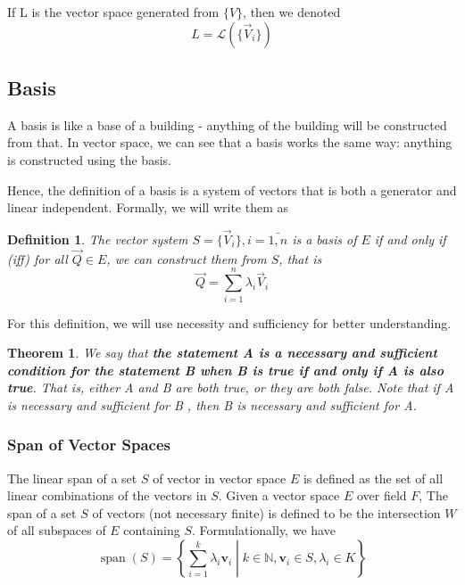 \documentclass{book}
\newtheorem{Definition}{Definition}[section]
\newtheorem{Theorem}{Theorem}[section]
\numberwithin{identity}{subsection}
\numberwithin{Rule}{subsection}
\numberwithin{Theorem}{subsection}
\numberwithin{Definition}{subsection}
\begin{document}
If L is the vector space generated from $\{V\}$, then we denoted $$L=
\mathcal{L}(\{\vec{V}_{i}\})$$

\subsection{Basis}

A basis is like a base of a building - anything of the building will be constructed from that. In vector space, we can see that a basis works the same way: anything is constructed using the basis. 

Hence, the definition of a basis is a system of vectors that is both a generator and linear independent. Formally, we will write them as

\begin{Definition}
    The vector system $S=\{\vec{V}_{i}\}, i=\bar{1,n}$ is a basis of $E$ if and only if (iff) for all $\vec{Q}\in E$, we can construct them from $S$, that is $$\vec{Q}= \sum_{i=1}^{n} \lambda_{i}\vec{V}_{i} $$
\end{Definition}

For this definition, we will use necessity and sufficiency for better understanding. 

\begin{Theorem}
    We say that \textbf{the statement A is a necessary and sufficient condition for the statement B when B is true if and only if A is also true}. That is, either A and B are both true, or they are both false. Note that if A is necessary and sufficient for B , then B is necessary and sufficient for A.
\end{Theorem}



\subsubsection{Span of Vector Spaces}

The linear span of a set $S$ of vector in vector space $E$ is defined as the set of all linear combinations of the vectors in $S$. Given a vector space $E$ over field $F$, The span of a set $S$ of vectors (not necessary finite) is defined to be the intersection $W$ of all subspaces of $E$ containing $S$. Formulationally, we have  $$\operatorname {span} (S)=\left\{{\left.\sum _{i=1}^{k}\lambda _{i}\mathbf {v} _{i}\;\right|\;k\in \mathbb {N} ,\mathbf {v} _{i}\in S,\lambda _{i}\in K}\right\}$$
\end{document}
